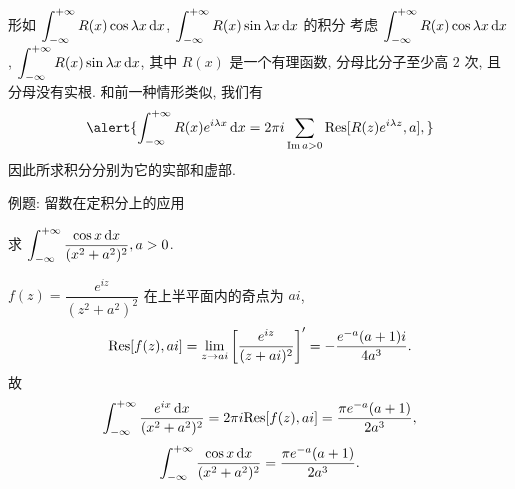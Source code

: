 \begin{frame}{形如 $\displaystyle\int_{-\infty}^{+\infty}R(x)\cos{\lambda x}\,\mathrm{d} x$,
$\displaystyle\int_{-\infty}^{+\infty}R(x)\sin{\lambda x}\,\mathrm{d} x$ 的积分}
\onslide<+->
考虑 $\displaystyle\int_{-\infty}^{+\infty}R(x)\cos{\lambda x}\,\mathrm{d} x$,
$\displaystyle\int_{-\infty}^{+\infty}R(x)\sin{\lambda x}\,\mathrm{d} x$, 其中 $R(x)$ 是一个有理函数, 分母比分子至少高 $2$ 次, 且分母没有实根.
\onslide<+->
和前一种情形类似, 我们有
\[\alert{\int_{-\infty}^{+\infty}R(x)e^{i\lambda x}\diff x
=2\pi i\sum_{\Im a>0}\Res[R(z)e^{i\lambda z},a],}\]
\onslide<+->
因此所求积分分别为它的实部和虚部.
\end{frame}


\begin{frame}{例题: 留数在定积分上的应用}
\beqskip{2pt}
\begin{example}
求 $\displaystyle\int_{-\infty}^{+\infty}\frac{\cos x\,\mathrm{d} x}{(x^2+a^2)^2}, a>0$.
\end{example}
\begin{solution}
$f(z)=\dfrac{e^{iz}}{(z^2+a^2)^2}$ 在上半平面内的奇点为 $ai$,
\onslide<+->
\[{\mathrm{Res}}[f(z),ai]=\lim_{z\to ai}\left[\frac{e^{iz}}{(z+ai)^2}\right]'=-\frac{e^{-a}(a+1)i}{4a^3}.\]
\onslide<+->
故
\[\int_{-\infty}^{+\infty}\frac{e^{ix}\,\mathrm{d} x}{(x^2+a^2)^2}=2\pi i {\mathrm{Res}}[f(z),ai]=\frac{\pi e^{-a}(a+1)}{2a^3},\]
\onslide<+->
\[\int_{-\infty}^{+\infty}\frac{\cos x\,\mathrm{d} x}{(x^2+a^2)^2}=\frac{\pi e^{-a}(a+1)}{2a^3}.\]
\end{solution}
\endgroup
\end{frame}

